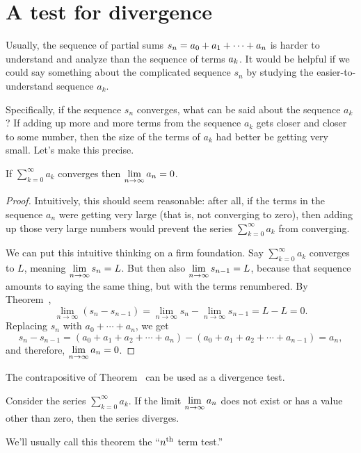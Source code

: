 \section{A test for divergence}
\label{section:nth-term-test}

Usually, the sequence of partial sums $\displaystyle s_n = a_0 + a_1 + \cdots +
a_n$ is harder to understand and analyze than the sequence of terms
$\displaystyle a_k$.  It would be helpful if we could say something about the
complicated sequence $s_n$ by studying the easier-to-understand
sequence $a_k$.

Specifically, if the sequence $s_n$ converges, what can be said about
the sequence $a_k$?  If adding up more and more terms from the
sequence $a_k$ gets closer and closer to some number, then the size of
the terms of $a_k$ had better be getting very small.  Let's make
this precise.

\begin{theorem}\label{thm:divergence-test} If $\sum_{k=0}^\infty a_k$
  converges then $\displaystyle\lim_{n\to\infty}a_n=0$.
\end{theorem}
\begin{proof} Intuitively, this should seem reasonable: after all, if
  the terms in the sequence $a_n$ were getting very large (that is,
  not converging to zero), then adding up those very large numbers
  would prevent the series $\sum_{k=0}^\infty a_k$ from converging.

  We can put this intuitive thinking on a firm foundation.  Say
  $\sum_{k=0}^\infty a_k$ converges to $L$, meaning
  $\displaystyle\lim_{n\to\infty}s_n=L$.  But then also
  $\displaystyle\lim_{n\to\infty}s_{n-1}=L$, because that sequence amounts to
  saying the same thing, but with the terms renumbered.  By
  Theorem~,
$$
  \lim_{n\to\infty} (s_{n}-s_{n-1})=
  \lim_{n\to\infty} s_{n}-\lim_{n\to\infty}s_{n-1}=L-L=0.
$$
Replacing $s_n$ with $a_0+\cdots+a_n$, we get
$$
  s_{n}-s_{n-1}=(a_0+a_1+a_2+\cdots+a_n)-(a_0+a_1+a_2+\cdots+a_{n-1})
  =a_n,
$$
and therefore, $\displaystyle\lim_{n\to\infty}a_n=0$.
\end{proof}

The contrapositive of Theorem~ can be used
as a divergence test.
\begin{theorem}\label{thm:nth-term-test}
Consider the series $\sum_{k=0}^\infty
a_k$. If the limit $\displaystyle\lim_{n\to\infty}a_n$ does not exist or has a value
other than zero, then the series diverges.
\end{theorem}
We'll usually call this theorem the ``$n^{\mbox{\scriptsize th}}$ term test.''

